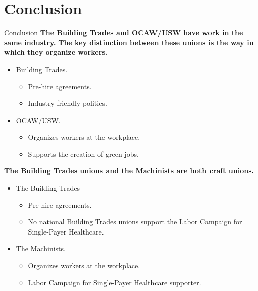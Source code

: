 \documentclass{beamer}
\begin{document}
\section{Conclusion}
\begin{frame}{Conclusion}
\textbf{The Building Trades and OCAW/USW have work in the same industry.}\newline
\textbf{The key distinction between these unions is the way in which they organize workers.}
\begin{itemize}
	\item Building Trades.
	\begin{itemize}
		\item Pre-hire agreements.
		\item Industry-friendly politics.
  	\end{itemize}
  	\item OCAW/USW.
  	\begin{itemize}
  		\item Organizes workers at the workplace.
  		\item Supports the creation of green jobs.
  	\end{itemize}
\end{itemize}
  		
\textbf{The Building Trades unions and the Machinists are both craft unions.}
\begin{itemize}
	\item The Building Trades
	\begin{itemize}
		\item Pre-hire agreements.
		\item No national Building Trades unions support the Labor Campaign for Single-Payer Healthcare.
	\end{itemize}
  	\item The Machinists.
  	\begin{itemize}
  		\item Organizes workers at the workplace.
  		\item Labor Campaign for Single-Payer Healthcare supporter.
  	\end{itemize}
\end{itemize}
\end{frame}

\end{document}
